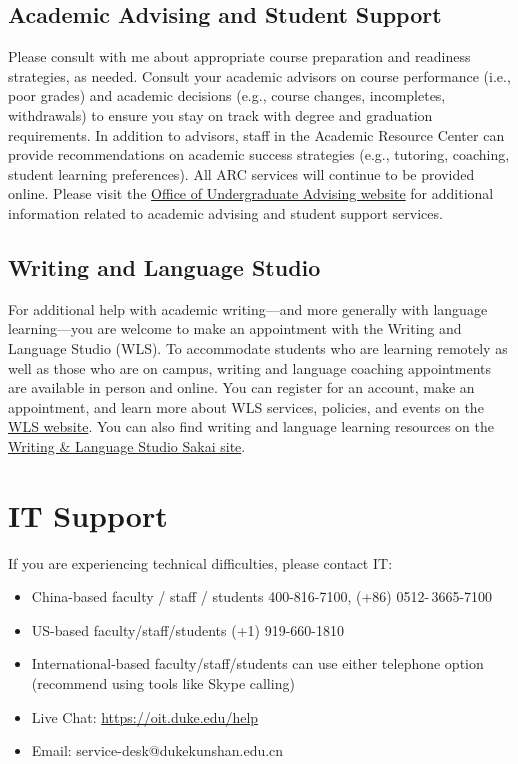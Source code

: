 \documentclass[11pt]{article}
\begin{document}
\subsection{Academic Advising and Student Support}
Please consult with me about appropriate course preparation and readiness strategies, as needed.  Consult your academic advisors on course performance (i.e., poor grades) and academic decisions (e.g., course changes, incompletes, withdrawals) to ensure you stay on track with degree and graduation requirements. In addition to advisors, staff in the Academic Resource Center can provide recommendations on academic success strategies (e.g., tutoring, coaching, student learning preferences).  All ARC services will continue to be provided online. Please visit the \href{https://dukekunshan.edu.cn/en/academics/advising}{Office of Undergraduate Advising website} for additional information related to academic advising and student support services. 

\subsection{Writing and Language Studio}

For additional help with academic writing---and more generally with language learning---you are welcome to make an appointment with the Writing and Language Studio (WLS). To accommodate students who are learning remotely as well as those who are on campus, writing and language coaching appointments are available in person and online. You can register for an account, make an appointment, and learn more about WLS services, policies, and events on the \href{https://dukekunshan.edu.cn/en/academics/language-and-culture-center/writing-and-language-studio}{WLS website}. You can also find writing and language learning resources on the \href{https://sakai.duke.edu/x/mQ6xqG}{Writing \& Language Studio Sakai site}.



\section{IT Support}

If you are experiencing technical difficulties, please contact IT:
\begin{itemize}[label={-},noitemsep]
\item China-based faculty / staff / students 400-816-7100, (+86) 0512- 3665-7100
\item US-based faculty/staff/students (+1) 919-660-1810
\item International-based faculty/staff/students can use either telephone option (recommend using tools like Skype calling)
\item Live Chat:  \url{https://oit.duke.edu/help}
\item Email:  service-desk@dukekunshan.edu.cn
\end{itemize}
\end{document}
